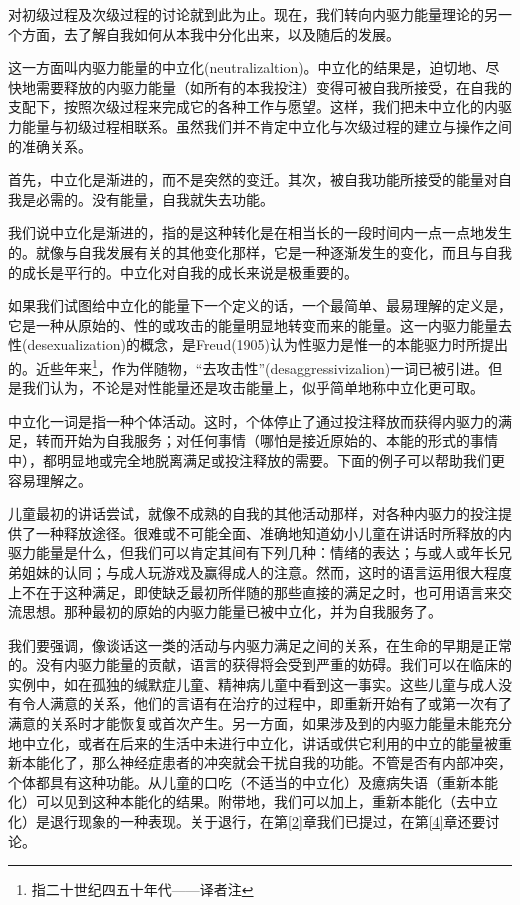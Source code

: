 \documentclass[UTF8,10pt,a4paper,openany]{book}
\begin{document}
对初级过程及次级过程的讨论就到此为止。现在，我们转向内驱力能量理论的另一个方面，去了解自我如何从本我中分化出来，以及随后的发展。

这一方面叫内驱力能量的中立化(neutralizaltion)。中立化的结果是，迫切地、尽快地需要释放的内驱力能量（如所有的本我投注）变得可被自我所接受，在自我的支配下，按照次级过程来完成它的各种工作与愿望。这样，我们把未中立化的内驱力能量与初级过程相联系。虽然我们并不肯定中立化与次级过程的建立与操作之间的准确关系。

首先，中立化是渐进的，而不是突然的变迁。其次，被自我功能所接受的能量对自我是必需的。没有能量，自我就失去功能。

我们说中立化是渐进的，指的是这种转化是在相当长的一段时间内一点一点地发生的。就像与自我发展有关的其他变化那样，它是一种逐渐发生的变化，而且与自我的成长是平行的。中立化对自我的成长来说是极重要的。

如果我们试图给中立化的能量下一个定义的话，一个最简单、最易理解的定义是，它是一种从原始的、性的或攻击的能量明显地转变而来的能量。这一内驱力能量去性(desexualization)的概念，是Freud(1905)认为性驱力是惟一的本能驱力时所提出的。近些年来\footnote{指二十世纪四五十年代——译者注}，作为伴随物，“去攻击性”(desaggressivizalion)一词已被引进。但是我们认为，不论是对性能量还是攻击能量上，似乎简单地称中立化更可取。

中立化一词是指一种个体活动。这时，个体停止了通过投注释放而获得内驱力的满足，转而开始为自我服务；对任何事情（哪怕是接近原始的、本能的形式的事情中），都明显地或完全地脱离满足或投注释放的需要。下面的例子可以帮助我们更容易理解之。

儿童最初的讲话尝试，就像不成熟的自我的其他活动那样，对各种内驱力的投注提供了一种释放途径。很难或不可能全面、准确地知道幼小儿童在讲话时所释放的内驱力能量是什么，但我们可以肯定其间有下列几种：情绪的表达；与或人或年长兄弟姐妹的认同；与成人玩游戏及赢得成人的注意。然而，这时的语言运用很大程度上不在于这种满足，即使缺乏最初所伴随的那些直接的满足之时，也可用语言来交流思想。那种最初的原始的内驱力能量已被中立化，并为自我服务了。

我们要强调，像谈话这一类的活动与内驱力满足之间的关系，在生命的早期是正常的。没有内驱力能量的贡献，语言的获得将会受到严重的妨碍。我们可以在临床的实例中，如在孤独的缄默症儿童、精神病儿童中看到这一事实。这些儿童与成人没有令人满意的关系，他们的言语有在治疗的过程中，即重新开始有了或第一次有了满意的关系时才能恢复或首次产生。另一方面，如果涉及到的内驱力能量未能充分地中立化，或者在后来的生活中未进行中立化，讲话或供它利用的中立的能量被重新本能化了，那么神经症患者的冲突就会干扰自我的功能。不管是否有内部冲突，个体都具有这种功能。从儿童的口吃（不适当的中立化）及癔病失语（重新本能化）可以见到这种本能化的结果。附带地，我们可以加上，重新本能化（去中立化）是退行现象的一种表现。关于退行，在第\ref{2}章我们已提过，在第\ref{4}章还要讨论。
\end{document}
